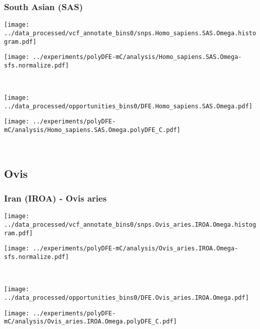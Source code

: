 \subsubsection{South Asian (SAS)}

\begin{minipage}{0.49\linewidth}
    \texttt{[image: ../data\_processed/vcf\_annotate\_bins0/snps.Homo\_sapiens.SAS.Omega.histogram.pdf]}
\end{minipage}
\begin{minipage}{0.49\linewidth}
    \texttt{[image: ../experiments/polyDFE-mC/analysis/Homo\_sapiens.SAS.Omega-sfs.normalize.pdf]}
\end{minipage}
\\
\begin{minipage}{0.49\linewidth}
    \texttt{[image: ../data\_processed/opportunities\_bins0/DFE.Homo\_sapiens.SAS.Omega.pdf]}
\end{minipage}
\begin{minipage}{0.49\linewidth}
    \texttt{[image: ../experiments/polyDFE-mC/analysis/Homo\_sapiens.SAS.Omega.polyDFE\_C.pdf]}
\end{minipage}
\\

\subsection{Ovis}

\subsubsection{Iran (IROA) - Ovis aries}

\begin{minipage}{0.49\linewidth}
    \texttt{[image: ../data\_processed/vcf\_annotate\_bins0/snps.Ovis\_aries.IROA.Omega.histogram.pdf]}
\end{minipage}
\begin{minipage}{0.49\linewidth}
    \texttt{[image: ../experiments/polyDFE-mC/analysis/Ovis\_aries.IROA.Omega-sfs.normalize.pdf]}
\end{minipage}
\\
\begin{minipage}{0.49\linewidth}
    \texttt{[image: ../data\_processed/opportunities\_bins0/DFE.Ovis\_aries.IROA.Omega.pdf]}
\end{minipage}
\begin{minipage}{0.49\linewidth}
    \texttt{[image: ../experiments/polyDFE-mC/analysis/Ovis\_aries.IROA.Omega.polyDFE\_C.pdf]}
\end{minipage}
\\

